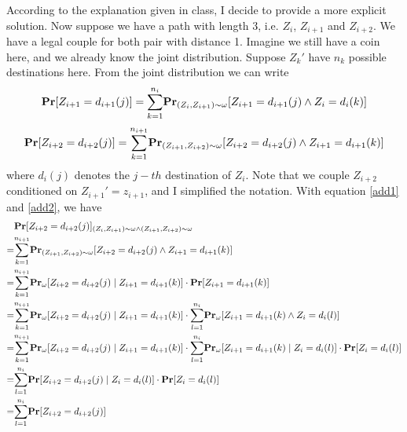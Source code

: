 \documentclass{article}
\theoremstyle{definition}
\begin{document}
\begin{enumerate}[(1)]
		\noindent [Additional] According to the explanation given in class, I decide to provide a more explicit solution. Now suppose we have a path with length 3, i.e. $Z_i$, $Z_{i+1}$ and $Z_{i+2}$. We have a legal couple for both pair with distance 1. Imagine we still have a coin here, and we already know the joint distribution. Suppose $Z_{k}'$ have $n_{k}$ possible destinations here. From the joint distribution we can write 
		\begin{equation}
			\mathbf{Pr}[Z_{i+1} = d_{i+1}(j)] = \overunderset{n_{i}}{k=1}{\sum}\mathbf{Pr}_{(Z_i, Z_{i+1})\sim \omega}[Z_{i+1} = d_{i+1}(j) \wedge Z_i = d_i(k)]
			\label{add1}
		\end{equation}		
		\begin{equation}
			\mathbf{Pr}[Z_{i+2} = d_{i+2}(j)] = \overunderset{n_{i+1}}{k=1}{\sum}\mathbf{Pr}_{(Z_{i+1}, Z_{i+2})\sim \omega}[Z_{i+2} = d_{i+2}(j) \wedge Z_{i+1} = d_{i+1}(k)]
			\label{add2}
		\end{equation}		
		where $d_i(j)$ denotes the $j-th$ destination of $Z_i$. Note that we couple $Z_{i+2}$ conditioned on $Z_{i+1}' = z_{i+1}$, and I simplified the notation. With equation \ref{add1} and \ref{add2}, we have
		\begin{equation}
			\begin{aligned}
			&\mathbf{Pr}[Z_{i+2} = d_{i+2}(j)]_{(Z_i, Z_{i+1})\sim \omega \wedge (Z_{i+1}, Z_{i+2})\sim \omega}\\
			=&\overunderset{n_{i+1}}{k=1}{\sum}\mathbf{Pr}_{(Z_{i+1}, Z_{i+2})\sim \omega}[Z_{i+2} = d_{i+2}(j) \wedge Z_{i+1} = d_{i+1}(k)]\\
			=&\overunderset{n_{i+1}}{k=1}{\sum}\mathbf{Pr}_\omega[Z_{i+2} = d_{i+2}(j) \mid Z_{i+1} = d_{i+1}(k)] \cdot \mathbf{Pr}[Z_{i+1} = d_{i+1}(k)]\\
			=&\overunderset{n_{i+1}}{k=1}{\sum}\mathbf{Pr}_\omega[Z_{i+2} = d_{i+2}(j) \mid Z_{i+1} = d_{i+1}(k)] \cdot \overunderset{n_{i}}{l=1}{\sum}\mathbf{Pr}_\omega[Z_{i+1} = d_{i+1}(k) \wedge Z_{i} = d_{i}(l)]\\
			=&\overunderset{n_{i+1}}{k=1}{\sum}\mathbf{Pr}_\omega[Z_{i+2} = d_{i+2}(j) \mid Z_{i+1} = d_{i+1}(k)] \cdot \overunderset{n_{i}}{l=1}{\sum}\mathbf{Pr}_\omega[Z_{i+1} = d_{i+1}(k) \mid Z_{i} = d_{i}(l)] \cdot \mathbf{Pr}[Z_{i} = d_{i}(l)]\\
			=&\overunderset{n_{i}}{l=1}{\sum}\mathbf{Pr}[Z_{i+2} = d_{i+2}(j) \mid Z_{i} = d_{i}(l)] \cdot \mathbf{Pr}[Z_{i} = d_{i}(l)]\\
			=&\overunderset{n_{i}}{l=1}{\sum}\mathbf{Pr}[Z_{i+2} = d_{i+2}(j)]\\

\end{aligned}
\end{equation}
\end{enumerate}
\end{document}
